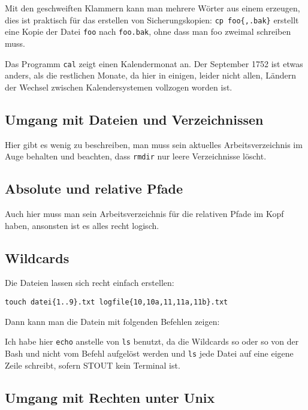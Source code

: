 \documentclass[12pt]{article}
\begin{document}
Mit den geschweiften Klammern kann man mehrere Wörter aus einem erzeugen, dies ist praktisch für das erstellen von Sicherungskopien: \verb#cp foo{,.bak}# erstellt eine Kopie der Datei \texttt{foo} nach \texttt{foo.bak}, ohne dass man foo zweimal schreiben muss.

Das Programm \texttt{cal} zeigt einen Kalendermonat an. Der September 1752 ist etwas anders, als die restlichen Monate, da hier in einigen, leider nicht allen, Ländern der Wechsel zwischen Kalendersystemen vollzogen worden ist.

\subsection{Umgang mit Dateien und Verzeichnissen}

Hier gibt es wenig zu beschreiben, man muss sein aktuelles Arbeitsverzeichnis im Auge behalten und beachten, dass \texttt{rmdir} nur leere Verzeichnisse löscht.

\subsection{Absolute und relative Pfade}

Auch hier muss man sein Arbeitsverzeichnis für die relativen Pfade im Kopf haben, ansonsten ist es alles recht logisch.

\subsection{Wildcards}

Die Dateien lassen sich recht einfach erstellen:
\begin{lstlisting}[caption=Anlegen der Dateien]
touch datei{1..9}.txt logfile{10,10a,11,11a,11b}.txt
\end{lstlisting}

Dann kann man die Datein mit folgenden Befehlen zeigen:



Ich habe hier \texttt{echo} anstelle von \texttt{ls} benutzt, da die Wildcards so oder so von der Bash und nicht vom Befehl aufgelöst werden und \texttt{ls} jede Datei auf eine eigene Zeile schreibt, sofern STOUT kein Terminal ist.

\subsection{Umgang mit Rechten unter Unix}
\end{document}
